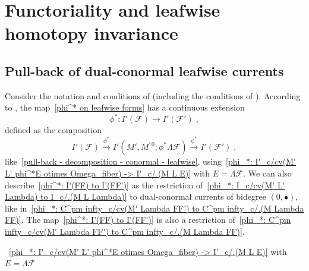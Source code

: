 \documentclass{memo-l}
\theoremstyle{plain}
\theoremstyle{definition}
\theoremstyle{remark}
\newcommand{\FF}{\mathcal{F}}
\numberwithin{section}{chapter}
\numberwithin{equation}{section}%
\begin{document}
\section{Functoriality and leafwise homotopy invariance}\label{s: functor and leafwise homotopy inv - dual-conormal}

\subsection{Pull-back of dual-conormal leafwise currents}\label{ss: pull-back of dual-conormal leafwise currents}

Consider the notation and conditions of  (including the conditions of ). According to , the map~\eqref{phi^* on leafwise forms} has a continuous extension
\begin{equation}\label{phi^*: I'(FF) to I'(FF')}
\phi^*:I'(\FF)\to I'(\FF')\;,
\end{equation}
defined as the composition
\[
I'(\FF) \xrightarrow{\phi^*} I'(M',M^{\prime\,0};\phi^*\Lambda\FF)
\xrightarrow{\phi^*} I'(\FF')\;,
\]
like~\eqref{pull-back - decomposition - conormal - leafwise}, using~\eqref{phi_*: I'_c/cv(M' L' phi^*E otimes Omega_fiber) -> I'_c/.(M L E)} with $E=\Lambda\FF$. We can also describe~\eqref{phi^*: I'(FF) to I'(FF')} as the restriction of~\eqref{phi_*: I_c/cv(M' L' Lambda) to I_c/.(M L Lambda)} to dual-conormal currents of bidegree $(0,\bullet)$, like in~\eqref{phi_*: C^pm infty_c/cv(M' Lambda FF') to C^pm infty_c/.(M Lambda FF)}. The map~\eqref{phi^*: I'(FF) to I'(FF')} is also a restriction of~\eqref{phi_*: C^pm infty_c/cv(M' Lambda FF') to C^pm infty_c/.(M Lambda FF)}. 

~\eqref{phi_*: I'_c/cv(M' L' phi^*E otimes Omega_fiber) -> I'_c/.(M L E)} with $E=\Lambda\FF$
\end{document}
